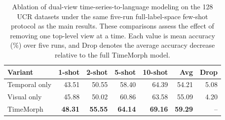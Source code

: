 \begin{table}[t]
\centering
\caption{Ablation of dual-view time-series-to-language modeling on the 128 UCR datasets under the same five-run full-label-space few-shot protocol as the main results. These comparisons assess the effect of removing one top-level view at a time. Each value is mean accuracy (\%) over five runs, and Drop denotes the average accuracy decrease relative to the full TimeMorph model.}
\label{tab:ablation-dual-view}
\begin{tabular}{lrrrrrr}
\toprule
Variant & 1-shot & 2-shot & 5-shot & 10-shot & Avg & Drop \\
\midrule
Temporal only & 43.51 & 50.55 & 58.40 & 64.39 & 54.21 & 5.08 \\
Visual only & 45.88 & 50.02 & 60.86 & 63.58 & 55.09 & 4.20 \\
TimeMorph & \textbf{48.31} & \textbf{55.55} & \textbf{64.14} & \textbf{69.16} & \textbf{59.29} & -- \\
\bottomrule
\end{tabular}
\end{table}
